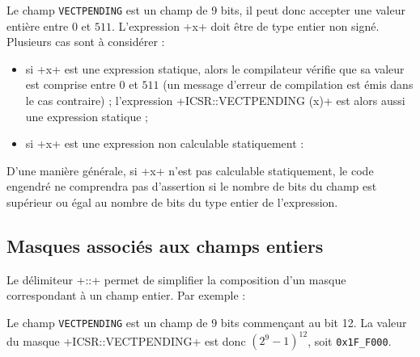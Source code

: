 
Le champ \texttt{VECTPENDING} est un champ de 9 bits, il peut donc accepter une valeur entière entre $0$ et $511$. L'expression \plm+x+ doit être de type entier non signé. Plusieurs cas sont à considérer :
\begin{itemize}
\item si \plm+x+ est une expression statique, alors le compilateur vérifie que sa valeur est comprise entre $0$ et $511$ (un message d'erreur de compilation est émis dans le cas contraire) ; l'expression \plm+ICSR::VECTPENDING (x)+ est alors aussi une expression statique ;
\item si \plm+x+ est une expression non calculable statiquement :
\end{itemize}

D'une manière générale, si \plm+x+ n'est pas calculable statiquement, le code engendré ne comprendra pas d'assertion si le nombre de bits du champ est supérieur ou égal au nombre de bits du type entier de l'expression.





\subsection{Masques associés aux champs entiers}

Le délimiteur \plm+::+ permet de simplifier la composition d'un masque correspondant à un champ entier. Par exemple :


Le champ \texttt{VECTPENDING} est un champ de 9 bits commençant au bit 12. La valeur du masque \plm+ICSR::VECTPENDING+ est donc $(2^9 - 1)^{12}$, soit \texttt{0x1F\_F000}.

